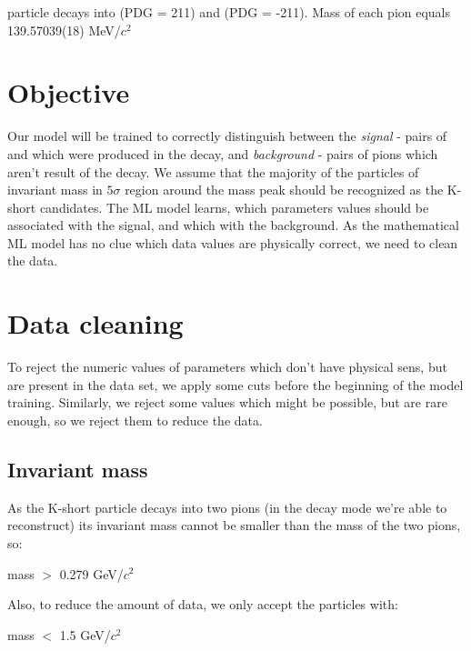 \documentclass[11pt,a4paper]{article}
\begin{document}
\PKshort particle decays into \Pgpp (PDG = 211) and \Pgpm (PDG = -211). Mass of each pion equals 139.57039(18) MeV/$c^2$

\newpage
\section{Objective}
Our model will be trained to correctly distinguish between the \emph{signal} - pairs of \Pgpp and \Pgpm which were produced in the \PKshort decay, and \emph{background} - pairs of pions which aren't result of the \KPshort decay. We assume that the majority of the particles of invariant mass in $5 \sigma$ region around the \KPshort mass peak should be recognized as the K-short candidates. The ML model learns, which parameters values should be associated with the signal, and which with the background. As the mathematical ML model has no clue which data values are physically correct, we need to clean the data.
\section{Data cleaning}
To reject the numeric values of parameters which don't have physical sens, but are present in the data set, we apply some cuts before the beginning of the model training. Similarly, we reject some values which might be possible, but are rare enough, so we reject them to reduce the data.

\subsection{Invariant mass}
As the K-short particle decays into two pions (in the decay mode we're able to reconstruct) its invariant mass cannot be smaller than the mass of the two pions, so:
\begin{center}
    mass $>$ 0.279 GeV/$c^2$
\end{center}
Also, to reduce the amount of data, we only accept the particles with:
\begin{center}
    mass $<$ 1.5 GeV/$c^2$
\end{center}

\end{document}
